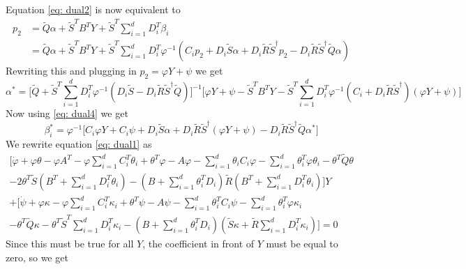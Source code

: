 Equation \eqref{eq: dual2} is now equivalent to
\begin{align*}
    p_2 &= \tilde{Q}\alpha + \tilde{S}^T B^T Y + \tilde{S}^T \sum_{i=1}^d D_i^T \beta_i \\
    &=\tilde{Q}\alpha + \tilde{S}^T B^T Y + \tilde{S}^T \sum_{i=1}^d D_i^T \varphi^{-1}(C_i p_2 + D_i \tilde{S}\alpha + D_i \tilde{R} \tilde{S}^\dagger p_2 - D_i \tilde{R}\tilde{S}^\dagger \tilde{Q} \alpha)
\end{align*}
Rewriting this and plugging in $p_2 = \varphi Y + \psi$ we get 
\begin{equation}
    \alpha^\ast = \bigg[ \tilde{Q} +\tilde{S}^T \sum_{i=1}^d D_i^T \varphi^{-1}( D_i \tilde{S} - D_i \tilde{R}\tilde{S}^\dagger \tilde{Q}) \bigg]^{-1} \bigg[\varphi Y + \psi - \tilde{S}^TB^T Y - \tilde{S}^T \sum_{i=1}^d D_i^T \varphi^{-1}(C_i + D_i\tilde{R}\tilde{S}^\dagger)(\varphi Y + \psi)  \bigg]
\end{equation}
Now using \eqref{eq: dual4} we get 
\begin{equation}
    \beta_i^\ast = \varphi^{-1}\big[ C_i \varphi Y + C_i \psi + D_i \tilde{S}\alpha + D_i \tilde{R} \tilde{S}^\dagger (\varphi Y + \psi) - D_i \tilde{R}\tilde{S}^\dagger \tilde{Q} \alpha^\ast \big]
\end{equation}
We rewrite equation \eqref{eq: dual1} as
\begin{align}
    \bigg[ \dot{\varphi} + \varphi \theta - \varphi A^T - \varphi \sum_{i=1}^d C_i^T \theta_i + \theta^T \varphi - A \varphi -\sum_{i=1}^d \theta_i C_i \varphi - \sum_{i=1}^d\theta_i^T\varphi \theta_i - \theta^T \tilde{Q}\theta\\
    - 2\theta^T \tilde{S}(B^T + \sum_{i=1}^d D_i^T \theta_i) - (B + \sum_{i=1}^d\theta_i^T D_i)\tilde{R} (B^T + \sum_{i=1}^d D_i^T \theta_i)\bigg]Y\\
    + \bigg[ \dot{\psi} + \varphi \kappa - \varphi \sum_{i=1}^d C_i^T \kappa_i + \theta^T \psi - A \psi - \sum_{i=1}^d \theta_i^T C_i \psi - \sum_{i=1}^d \theta_i^T \varphi \kappa_i \\
    -\theta^T \tilde{Q} \kappa - \theta^T \tilde{S}^T\sum_{i=1}^d D_i^T\kappa_i - (B + \sum_{i=1}^d\theta_i^T D_i) (\tilde{S}\kappa + \tilde{R} \sum_{i=1}^d D_i^T \kappa_i)\bigg] = 0
\end{align}
Since this must be true for all $Y$, the coefficient in front of $Y$ must be equal to zero, so we get
